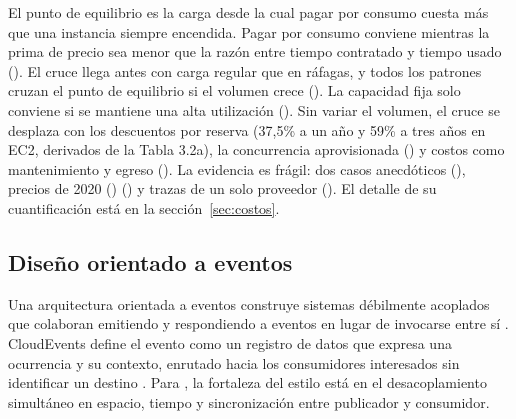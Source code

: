 \documentclass[12pt, letterpaper, table, xcdraw]{inf-pucv}
\begin{document}
El punto de equilibrio es la carga desde la cual pagar por consumo cuesta más que una instancia siempre encendida. Pagar por consumo conviene mientras la prima de precio sea menor que la razón entre tiempo contratado y tiempo usado (\cite{xiayue_charles_lin_serverless_2020,copik2021sebs}). El cruce llega antes con carga regular que en ráfagas, y todos los patrones cruzan el punto de equilibrio si el volumen crece (\cite{liu2024demystifying}). La capacidad fija solo conviene si se mantiene una alta utilización (\cite{copik2021sebs}). Sin variar el volumen, el cruce se desplaza con los descuentos por reserva (37,5\% a un año y 59\% a tres años en EC2, derivados de la Tabla 3.2a), la concurrencia aprovisionada (\cite{lin_demystifying_2026}) y costos como mantenimiento y egreso (\cite{hamza2024costdynamics}). La evidencia es frágil: dos casos anecdóticos (\cite{gojko_adzic_serverless_2017}), precios de 2020 (\cite{xiayue_charles_lin_serverless_2020}) (\cite{copik2021sebs}) y trazas de un solo proveedor (\cite{lin_demystifying_2026}). El detalle de su cuantificación está en la sección~\ref{sec:costos}.
\subsection{Diseño orientado a eventos}
\label{sec:eventos}

Una arquitectura orientada a eventos construye sistemas débilmente acoplados que
colaboran emitiendo y respondiendo a eventos en lugar de invocarse entre sí
\parencite{awseventbridge}. CloudEvents define el evento como un registro de
datos que expresa una ocurrencia y su contexto, enrutado hacia los consumidores
interesados sin identificar un destino \parencite{cloudevents102}. Para
\textcite{eugster2003}, la fortaleza del estilo está en el desacoplamiento
simultáneo en espacio, tiempo y sincronización entre publicador y consumidor.
\end{document}

